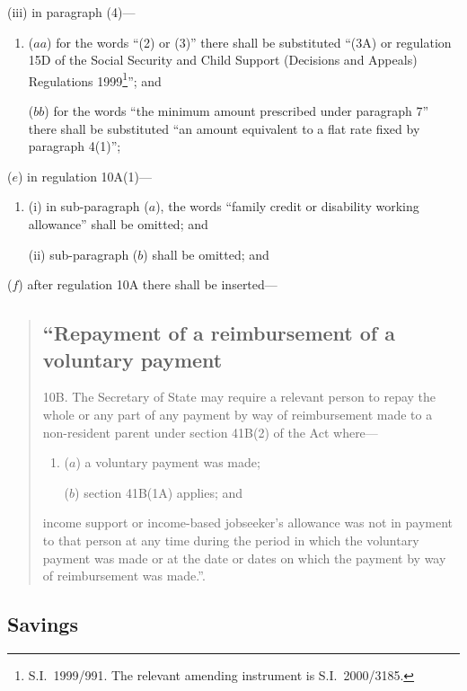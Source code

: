 \documentclass[12pt,a4paper]{article}
\begin{document}
\begin{enumerate}
\begin{enumerate}
(iii) in paragraph (4)—
\begin{enumerate}\item[]
($aa$) for the words “(2) or (3)” there shall be substituted “(3A) or regulation 15D of the Social Security and Child Support (Decisions and Appeals) Regulations 1999\footnote{S.I.\ 1999/991. The relevant amending instrument is S.I.\ 2000/3185.}”; and

($bb$) for the words “the minimum amount prescribed under paragraph 7” there shall be substituted “an amount equivalent to a flat rate fixed by paragraph 4(1)”;
\end{enumerate}
\end{enumerate}

($e$) in regulation 10A(1)—
\begin{enumerate}\item[]
(i) in sub-paragraph ($a$), the words “family credit or disability working allowance” shall be omitted; and

(ii) sub-paragraph ($b$)  shall be omitted; and
\end{enumerate}

($f$) after regulation 10A there shall be inserted—
\begin{quotation}
\subsection*{“Repayment of a reimbursement of a voluntary payment}

10B.  The Secretary of State may require a relevant person to repay the whole or any part of any payment by way of reimbursement made to a non-resident parent under section 41B(2) of the Act where—
\begin{enumerate}\item[]
($a$) a voluntary payment was made;

($b$) section 41B(1A) applies; and
\end{enumerate}
income support or income-based jobseeker’s allowance was not in payment to that person at any time during the period in which the voluntary payment was made or at the date or dates on which the payment by way of reimbursement was made.”.
\end{quotation}
\end{enumerate}

\subsection[6. Savings]{Savings}
\end{document}
